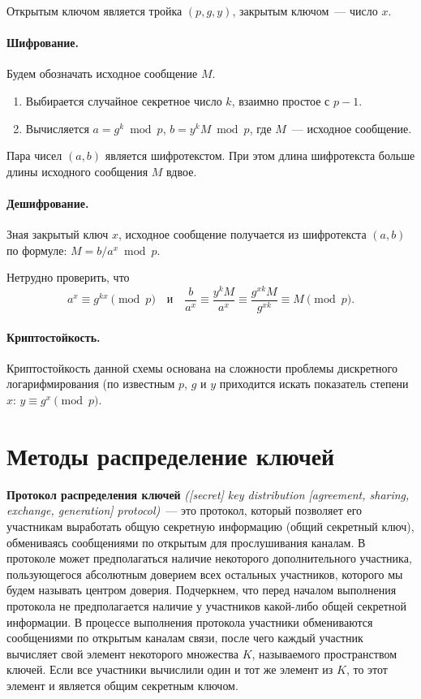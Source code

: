 \documentclass[a4paper,10pt]{article}
\begin{document}
Открытым ключом является тройка $(p,g,y)$, закрытым ключом~---  число $x$.

\paragraph{Шифрование.}
Будем обозначать исходное сообщение $M$.

\begin{enumerate}
   \item Выбирается случайное секретное число $k$, взаимно простое с $p - 1$.
   \item Вычисляется $a = g^k\bmod p$, $b = y^kM\bmod p$, где $M$~--- исходное сообщение.
\end{enumerate}

Пара чисел $(a,b)$ является шифротекстом. При этом длина шифротекста больше длины исходного сообщения $M$ вдвое.

\paragraph{Дешифрование.} 
Зная закрытый ключ $x$, исходное сообщение получается из шифротекста $(a,b)$ по формуле: $M = b / a^x\bmod p.$

Нетрудно проверить, что
$$a^x\equiv g^{kx}\pmod{p}\quad\text{и}\quad\frac{b}{a^x}\equiv \frac{y^kM}{a^x}\equiv \frac{g^{xk}M}{g^{xk}}\equiv M \pmod{p}.$$

\paragraph{Криптостойкость.} 
Криптостойкость данной схемы основана на сложности проблемы дискретного логарифмирования (по известным $p$, $g$ и $y$ приходится искать показатель
степени $x$: $y \equiv g^x \pmod{p}.$


\section{Методы распределение ключей}
{\bf Протокол распределения ключей} {\it ([secret] key distribution [agreement, sharing, exchange, generation]
protocol)}~--- это протокол, который позволяет его участникам выработать общую секретную информацию
(общий секретный ключ), обмениваясь сообщениями по открытым для прослушивания каналам. 
В протоколе может предполагаться наличие некоторого дополнительного
участника, пользующегося абсолютным доверием всех остальных участников, которого мы будем называть
центром доверия. Подчеркнем, что перед началом выполнения протокола не предполагается наличие у
участников какой-либо общей секретной информации. В процессе выполнения протокола участники
обмениваются сообщениями по открытым каналам связи, после чего каждый участник вычисляет свой
элемент некоторого множества $K$, называемого пространством ключей. Если все участники вычислили
один и тот же элемент из $K$, то этот элемент и является общим секретным ключом. 
\end{document}
